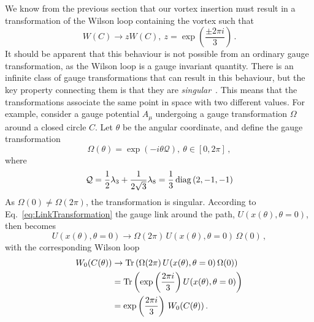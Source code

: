 We know from the previous section that our vortex insertion must result in a transformation of the Wilson loop containing the vortex such that
%
\begin{equation}
W(C)\rightarrow z W(C),~z = \exp\left(\frac{\pm2\pi i}{3}\right)\, .
\end{equation} 
%
It should be apparent that this behaviour is not possible from an ordinary gauge transformation, as the Wilson loop is a gauge invariant quantity. There is an infinite class of gauge transformations that can result in this behaviour, but the key property connecting them is that they are \textit{singular}~\cite{'tHooft:1977hy}. This means that the transformations associate the same point in space with two different values. For example, consider a gauge potential $A_\mu$ undergoing a gauge transformation $\Omega$ around a closed circle $C$. Let $\theta$ be the angular coordinate, and define the gauge transformation
%
\begin{equation}
\Omega(\theta) = \exp\left(-i\theta \mathcal{Q}\right),~\theta\in [0,2\pi]\, ,
\label{eq:SingularGT}
\end{equation}
%
where
%
\begin{equation}
\mathcal{Q} = \frac{1}{2}\lambda_3 +\frac{1}{2\sqrt{3}}\lambda_8 = \frac{1}{3}\operatorname{diag}\left(2,-1,-1\right)\label{eq:Q}
\end{equation}
As $\Omega(0) \neq \Omega(2\pi)$, the transformation is singular. According to Eq.~\eqref{eq:LinkTransformation} the gauge link around the path, $U(x(\theta),\theta=0)$, then becomes
%
\begin{equation}
U(x(\theta),\theta=0) \rightarrow \Omega(2\pi)\,U(x(\theta),\theta=0)\,\Omega(0)\, ,
\end{equation}
%
with the corresponding Wilson loop
%
\begin{align}
W_0(C(\theta)) &\rightarrow \operatorname{Tr}\left( \Omega(2\pi)\,U(x(\theta),\theta=0)\,\Omega(0)\right)\\
&=\operatorname{Tr}\left(\exp\left(\frac{2\pi i}{3}\right)U(x(\theta),\theta=0)\right)\\
&=\exp\left(\frac{2\pi i}{3}\right)\,W_0(C(\theta))\, .
\end{align}

